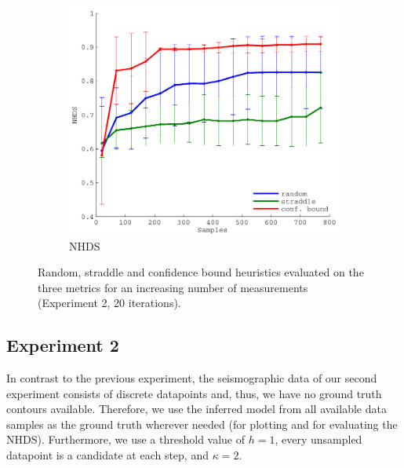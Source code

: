\documentclass[11pt]{article} %
\begin{document}
\begin{figure}[h!]
  \hfill
  \begin{subfigure}[b]{0.329\textwidth}
    \centering
    \includegraphics[width=\textwidth]{figures/quake_hd}
    \caption{NHDS}
  \end{subfigure}
  \caption{Random, straddle and confidence bound heuristics evaluated on the three
           metrics for an increasing number of measurements
           (Experiment 2, 20 iterations).}
  \label{fig:quake_eval}
\end{figure}

\subsection{Experiment 2}
In contrast to the previous experiment, the seismographic data of our second
experiment consists of discrete datapoints and, thus, we have no ground
truth contours available. Therefore, we use the inferred model from all
available data samples as the ground truth wherever needed (for plotting and
for evaluating the NHDS). Furthermore, we use a threshold value of $h = 1$, every
unsampled datapoint is a candidate at each step, and $\kappa = 2$.
\end{document}
